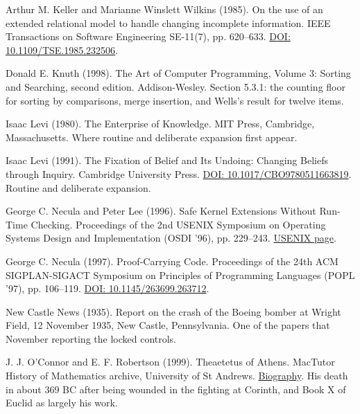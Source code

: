 \noindent Arthur M. Keller and Marianne Winslett Wilkins (1985). On the use of an extended relational model to handle changing incomplete information. IEEE Transactions on Software Engineering SE-11(7), pp. 620--633. \href{https://doi.org/10.1109/TSE.1985.232506}{DOI: 10.1109/TSE.1985.232506}.
\par\medskip

\noindent Donald E. Knuth (1998). The Art of Computer Programming, Volume 3: Sorting and Searching, second edition. Addison-Wesley. Section 5.3.1: the counting floor for sorting by comparisons, merge insertion, and Wells's result for twelve items.
\par\medskip

\noindent Isaac Levi (1980). The Enterprise of Knowledge. MIT Press, Cambridge, Massachusetts. Where routine and deliberate expansion first appear.
\par\medskip

\noindent Isaac Levi (1991). The Fixation of Belief and Its Undoing: Changing Beliefs through Inquiry. Cambridge University Press. \href{https://doi.org/10.1017/CBO9780511663819}{DOI: 10.1017/CBO9780511663819}. Routine and deliberate expansion.
\par\medskip

\noindent George C. Necula and Peter Lee (1996). Safe Kernel Extensions Without Run-Time Checking. Proceedings of the 2nd USENIX Symposium on Operating Systems Design and Implementation (OSDI '96), pp. 229--243. \href{https://www.usenix.org/conference/osdi-96/safe-kernel-extensions-without-run-time-checking}{USENIX page}.
\par\medskip

\noindent George C. Necula (1997). Proof-Carrying Code. Proceedings of the 24th ACM SIGPLAN-SIGACT Symposium on Principles of Programming Languages (POPL '97), pp. 106--119. \href{https://doi.org/10.1145/263699.263712}{DOI: 10.1145/263699.263712}.
\par\medskip

\noindent New Castle News (1935). Report on the crash of the Boeing bomber at Wright Field, 12 November 1935, New Castle, Pennsylvania. One of the papers that November reporting the locked controls.
\par\medskip

\noindent J. J. O'Connor and E. F. Robertson (1999). Theaetetus of Athens. MacTutor History of Mathematics archive, University of St Andrews. \href{https://mathshistory.st-andrews.ac.uk/Biographies/Theaetetus/}{Biography}. His death in about 369 BC after being wounded in the fighting at Corinth, and Book X of Euclid as largely his work.
\par\medskip

